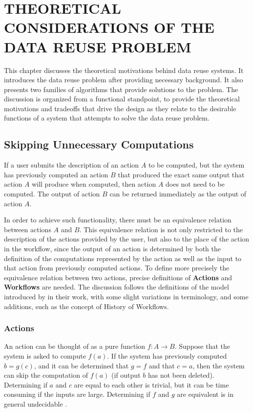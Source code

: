 \chapter{THEORETICAL CONSIDERATIONS OF THE DATA REUSE PROBLEM}
\label{chap:foundational}
This chapter discusses the theoretical motivations behind data reuse systems.  It introduces the data reuse problem after providing necessary background. It also presents two families of algorithms that provide solutions to the problem. The discussion is organized from a functional standpoint, to provide the theoretical motivations and tradeoffs that drive the design as they relate to the desirable functions of a system that attempts to solve the data reuse problem.

\section{Skipping Unnecessary Computations}
If a user submits the description of an action $A$ to be computed, but the system has previously computed an action $B$ that produced the exact same output that action $A$ will produce when computed, then action $A$ does not need to be computed.  The output of action $B$ can be returned immediately as the output of action $A$.  

In order to achieve such functionality, there must be an equivalence relation between actions $A$ and $B$. This equivalence relation is not only restricted to the description of the actions provided by the user, but also to the place of the action in the workflow, since the output of an action is determined by both the definition of the computations represented by the action as well as the input to that action from previously computed actions. To define more precisely the equivalence relation between two actions, precise definitions of \textbf{Actions} and \textbf{Workflows} are needed. The discussion follows the definitions of the model introduced by \cite{zohrevandi2013bounded} in their work, with some slight variations in terminology, and some additions, such as the concept of History of Workflows.

\subsection{Actions}
An action can be thought of as a pure function $f:A \rightarrow B$.  Suppose that the system is asked to compute $f(a)$.  If the system has previously computed $b=g(c)$, and it can be determined that $g=f$ and that $c=a$, then the system can skip the computation of $f(a)$ (if output $b$ has not been deleted).  Determining if $a$ and $c$ are equal to each other is trivial, but it can be time consuming if the inputs are large.  Determining if $f$ and $g$ are equivalent is in general undecidable \citep{turing1937computable}.

